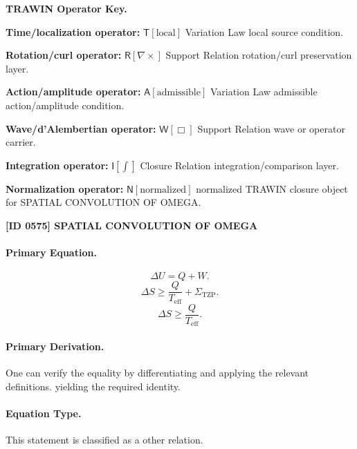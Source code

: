 \par\vspace{0.45\baselineskip}
\noindent\begin{minipage}[t]{\linewidth}
\begingroup
\small
\raggedright
\textbf{TRAWIN Operator Key.}\par
\noindent\textbf{Time/localization operator:} $\mathsf{T}\!\left[\mathrm{local}\right]$ Variation Law local source condition.\par
\noindent\textbf{Rotation/curl operator:} $\mathsf{R}\!\left[\nabla\times\right]$ Support Relation rotation/curl preservation layer.\par
\noindent\textbf{Action/amplitude operator:} $\mathsf{A}\!\left[\mathrm{admissible}\right]$ Variation Law admissible action/amplitude condition.\par
\noindent\textbf{Wave/d'Alembertian operator:} $\mathsf{W}\!\left[\Box\right]$ Support Relation wave or operator carrier.\par
\noindent\textbf{Integration operator:} $\mathsf{I}\!\left[\int\right]$ Closure Relation integration/comparison layer.\par
\noindent\textbf{Normalization operator:} $\mathsf{N}\!\left[\mathrm{normalized}\right]$ normalized TRAWIN closure object for SPATIAL CONVOLUTION OF OMEGA.\par
\endgroup
\end{minipage}

\clearpage
\noindent\textbf{[ID 0575] SPATIAL CONVOLUTION OF OMEGA}\par
\vspace{0.35em}
\paragraph{Primary Equation.}
\[
\Delta U = Q+W.
\]
\[
\Delta S \geq \frac{Q}{T_{\mathrm{eff}}} + \Sigma_{\mathrm{TZP}}.
\]
\[
\Delta S\geq \frac{Q}{T_{\mathrm{eff}}}.
\]

\paragraph{Primary Derivation.}
One can verify the equality by differentiating and applying the relevant definitions. yielding the required identity.
\paragraph{Equation Type.}
This statement is classified as a other relation.

